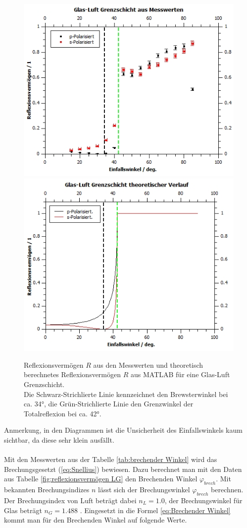 \documentclass[12pt,a4paper,twoside]{article}
\begin{document}
\begin{figure}[H]
    \centering
    \includegraphics[width=0.6\linewidth]{nudes/GL Mess.jpg}
    \includegraphics[width=0.6\linewidth]{nudes/GL theor.jpg}
    \caption{Reflexionsvermögen $R$ aus den Messwerten und theoretisch berechnetes Reflexionsvermögen $R$ aus MATLAB für eine Glas-Luft Grenzschicht. \\
    Die Schwarz-Strichlierte Linie kennzeichnet den Brewsterwinkel bei ca. 34°, die Grün-Strichlierte Linie den Grenzwinkel der Totalreflexion bei ca. 42°. }
    \label{fig:reflexionsvermögen GL}
\end{figure}

\noindent
Anmerkung, in den Diagrammen ist die Unsicherheit des Einfallswinkels kaum sichtbar, da diese sehr klein ausfällt. 
\\
\\
Mit den Messwerten aus der Tabelle \ref{tab:brechender Winkel} wird das Brechungsgesetzt (\ref{eq:Snellius}) bewiesen. 
Dazu berechnet man mit den Daten aus Tabelle \ref{fig:reflexionsvermögen LG} den Brechenden Winkel $\varphi_{brech}$. 
Mit bekannten Brechungsindizes $n$ lässt sich der Brechungswinkel $\varphi_{brech}$ berechnen. 
Der Brechungsindex von Luft beträgt dabei $n_L = 1.0$, der Brechungswinkel für Glas beträgt $n_G = 1.488$ \cite{teachcenter2}. 
Eingesetzt in die Formel \ref{eq:Brechender Winkel} kommt man für den Brechenden Winkel auf folgende Werte. 
\end{document}
